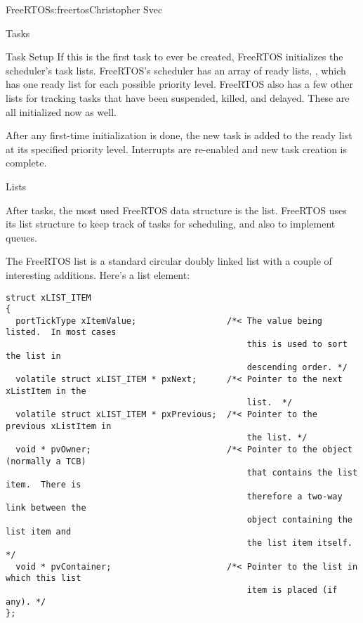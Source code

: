 \begin{aosachapter}{FreeRTOS}{s:freertos}{Christopher Svec}
\begin{aosasect1}{Tasks}
\begin{aosasect2}{Task Setup}
If this is the first task to ever be created, FreeRTOS initializes the
scheduler's task lists. FreeRTOS's scheduler has an array of ready
lists, , which has one ready list for each
possible priority level. FreeRTOS also has a few other lists for
tracking tasks that have been suspended, killed, and delayed. These
are all initialized now as well.

After any first-time initialization is done, the new task is added to
the ready list at its specified priority level.  Interrupts are
re-enabled and new task creation is complete.

\end{aosasect2}

\end{aosasect1}

\begin{aosasect1}{Lists}

After tasks, the most used FreeRTOS data structure is the
list. FreeRTOS uses its list structure to keep track of tasks for
scheduling, and also to implement queues.

The FreeRTOS list is a standard circular doubly linked list with a
couple of interesting additions. Here's a list element:

\begin{verbatim}
struct xLIST_ITEM
{
  portTickType xItemValue;                  /*< The value being listed.  In most cases
                                                this is used to sort the list in 
                                                descending order. */
  volatile struct xLIST_ITEM * pxNext;      /*< Pointer to the next xListItem in the 
                                                list.  */
  volatile struct xLIST_ITEM * pxPrevious;  /*< Pointer to the previous xListItem in 
                                                the list. */
  void * pvOwner;                           /*< Pointer to the object (normally a TCB)
                                                that contains the list item.  There is
                                                therefore a two-way link between the 
                                                object containing the list item and 
                                                the list item itself. */
  void * pvContainer;                       /*< Pointer to the list in which this list
                                                item is placed (if any). */
};
\end{verbatim}


\end{aosasect1}
\end{aosachapter}
